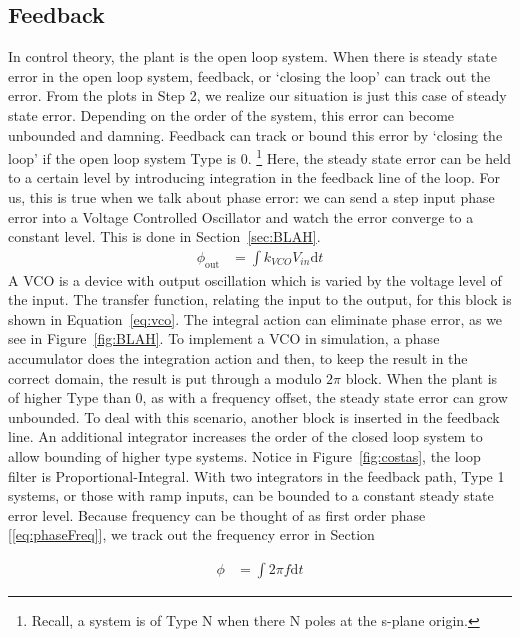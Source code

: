 \documentclass[]{article}
\begin{document}
\subsection{Feedback}
In control theory, the plant is the open loop system.  When there is steady state error in the open loop system, feedback, or `closing the loop' can track out the error.  From the plots in Step 2, we realize our situation is just this case of steady state error.  Depending on the order of the system, this error can become unbounded and damning.  Feedback can track or bound this error by `closing the loop' if the open loop system Type is 0.  \footnote{Recall, a system is of Type N when there N poles at the s-plane origin.}  Here, the steady state error can be held to a certain level by introducing integration in the feedback line of the loop.  For us, this is true when we talk about phase error: we can send a step input phase error into a Voltage Controlled Oscillator and watch the error converge to a constant level.  This is done in Section~\ref{sec:BLAH}. 
\begin{align}
\label{eq:vco}
\phi_{\text{out}} &= \int \! k_{VCO}V_{in} \mathrm{d}t
\end{align}
A VCO is a device with output oscillation which is varied by the voltage level of the input.  The transfer function, relating the input to the output, for this block is shown in Equation~\ref{eq:vco}. The integral action can eliminate phase error, as we see in Figure~\ref{fig:BLAH}.  To implement a VCO in simulation, a phase accumulator does the integration   action and then, to keep the result in the correct domain, the result is put through a modulo $2\pi$ block.   
When the plant is of higher Type than 0, as with a frequency offset, the steady state error can grow unbounded.  To deal with this scenario, another block is inserted in the feedback line.  An additional integrator increases the order of the closed loop system to allow bounding of higher type systems.  Notice in Figure~\ref{fig:costas}, the loop filter is Proportional-Integral.  With two integrators in the feedback path, Type 1 systems, or those with ramp inputs, can be bounded to a constant steady state error level.  Because frequency can be thought of as first order phase [\ref{eq:phaseFreq}], we track out the frequency error in Section

\begin{align}
\label{eq:phaseFreq}
\phi &= \int \! 2\pi f \mathrm{d}t 
\end{align}

\newpage
\end{document}
